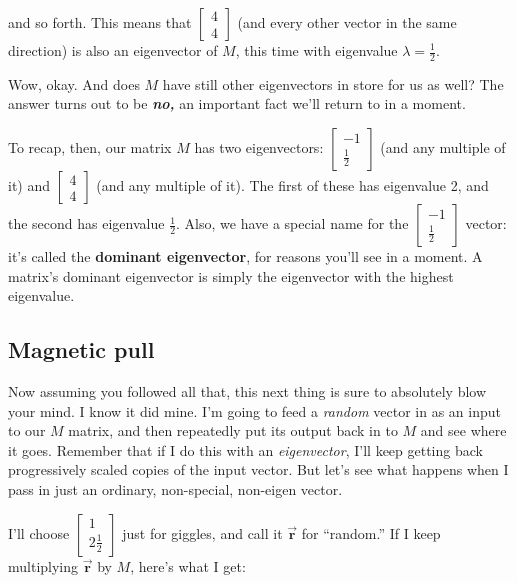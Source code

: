 and so forth. This means that {\footnotesize $\begin{bmatrix} 4 \\ 4
\end{bmatrix}$} (and every other vector in the same direction) is also an
eigenvector of $M$, this time with eigenvalue $\lambda=\frac{1}{2}$.

\bigskip

Wow, okay. And does $M$ have still other eigenvectors in store for us as well?
The answer turns out to be \textbf{\textit{no,}} an important fact we'll return
to in a moment.

\medskip


To recap, then, our matrix $M$ has two eigenvectors: {\scriptsize
$\begin{bmatrix} -1 \\ \frac{1}{2} \end{bmatrix}$} (and any multiple of it) and
{\scriptsize $\begin{bmatrix} 4 \\ 4 \end{bmatrix}$} (and any multiple of it).
The first of these has eigenvalue 2, and the second has eigenvalue
$\frac{1}{2}$. Also, we have a special name for the {\scriptsize
$\begin{bmatrix} -1 \\ \frac{1}{2} \end{bmatrix}$} vector: it's called the
\textbf{dominant eigenvector}, for reasons you'll see in a moment. A matrix's
dominant eigenvector is simply the eigenvector with the highest eigenvalue.

\subsection{Magnetic pull}

Now assuming you followed all that, this next thing is sure to absolutely blow
your mind. I know it did mine. I'm going to feed a \textit{random} vector in as
an input to our $M$ matrix, and then repeatedly put its output back in to $M$
and see where it goes. Remember that if I do this with an \textit{eigenvector},
I'll keep getting back progressively scaled copies of the input vector. But
let's see what happens when I pass in just an ordinary, non-special, non-eigen
vector.

I'll choose {\footnotesize $\begin{bmatrix} 1 \\ 2\frac{1}{2} \end{bmatrix}$}
just for giggles, and call it $\overrightarrow{\textbf{r}}$ for ``random.'' If
I keep multiplying $\overrightarrow{\textbf{r}}$ by $M$, here's what I get:

